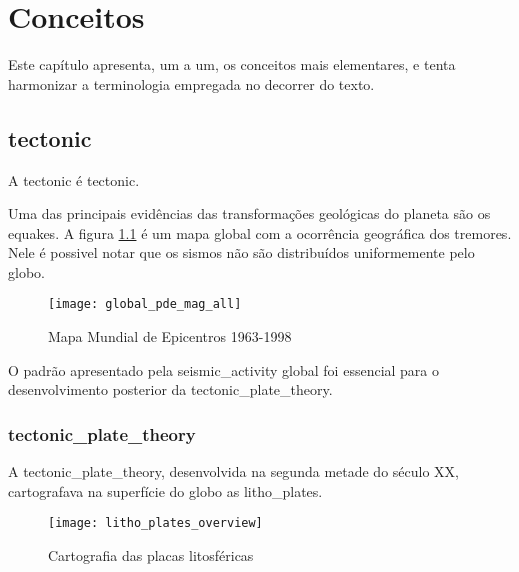 \chapter{Conceitos}
\label{cap:conceitos}

Este capítulo apresenta, um a um, os conceitos mais elementares, 
e tenta harmonizar a terminologia empregada no decorrer do texto.


\section{\Gls{tectonic}}
\label{sec:02_tectonica}

A \gls{tectonic} é \glsdesc*{tectonic}.

Uma das principais evidências das transformações geológicas do planeta 
são os \glspl{equake}. A figura \ref{f:global_epicenters} \citep{img_world_epicenters}
é um mapa global com a ocorrência geográfica dos tremores. Nele é possivel notar que 
os sismos não são distribuídos uniformemente pelo globo.

\begin{figure}[H]
   \centering
   \texttt{[image: global\_pde\_mag\_all]}
   \caption[Mapa Mundial de Epicentros 1963-1998]
   		   {Mapa Mundial de Epicentros 1963-1998\footnotemark} 
   \label{f:global_epicenters}
\end{figure} 
 
O padrão apresentado pela \gls{seismic_activity} global foi essencial 
para o desenvolvimento posterior da \gls*{tectonic_plate_theory}.

\subsection{\Gls{tectonic_plate_theory}}
\label{sec:02_placas}

A \gls*{tectonic_plate_theory}, desenvolvida na segunda metade do século XX,
cartografava na superfície do globo as \glspl{litho_plate}.


\begin{figure}[H]
   \centering
   \texttt{[image: litho\_plates\_overview]}
   \caption[Cartografia das placas litosféricas]
   		   {Cartografia das placas litosféricas\footnotemark} 
   \label{f:plates_overview}
\end{figure} 
 


